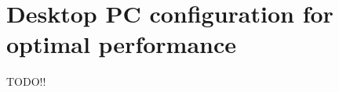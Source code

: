 \section{Desktop PC configuration for optimal performance}
\label{sec:implementations_desktop}

TODO!!

